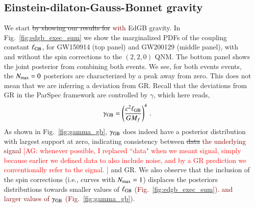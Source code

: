 \documentclass[twocolumn,
               prd,
               aps,
               superscriptaddress,
               tightenlines,
               nofootinbib,
               eqsecnum,
               amsfonts,
               amsmath,
               longbibliography]{revtex4-1}
\newcommand{\agcomm}[1]{{\textcolor{red}{{[AG: #1]}} }}
\newcommand{\ag}[1]{{\textcolor{Maroon}{{#1}} }}
\newcommand{\hs}[1]{{\textcolor{blue}{{[HS: #1]}} }}
\begin{document}



\subsection{Einstein-dilaton-Gauss-Bonnet gravity}
\label{sec:results_edgb}

We start \sout{by showing our results for} \ag{with} EdGB gravity.
%
In Fig.~\ref{fig:edgb_exec_sum} we show the marginalized PDFs of the
coupling constant $\ell_{\rm GB}$, for GW150914 (top panel) and GW200129
(middle panel), with and without the spin corrections to the $(2,2,0)$ QNM.
%
The bottom panel shows the joint posterior from combining both events.
%
We see, for both events events, the $N_{\rm max} = 0$ posteriors are
characterized by a peak away from zero.
%
This does not mean that we are inferring a deviation from GR.
%
Recall that the deviations from GR in the ParSpec framework are controlled
by $\gamma$, which here reads,
%
\begin{equation}
    \gamma_{\rm GB} = \left(\frac{c^2 \ell_{\rm GB}}{ G M_{f}}\right)^4\,.
    \label{eq:def_gamma_gb}
\end{equation}
%
As shown in Fig.~\ref{fig:gamma_gb}, $\gamma_{\rm GB}$ does indeed have a posterior
distribution with largest support at zero, indicating consistency between \sout{data}
\ag{the underlying signal} \agcomm{whenever possible, I replaced ``data" when we
meant signal, simply because earlier we defined data to also include noise, and by a
GR prediction we conventionally refer to the signal. }
and GR.
%
We also observe that the inclusion of the spin corrections (i.e., curves with $N_{\rm max} = 1$)
displaces the posteriors distributions towards smaller values of $\ell_{\rm GB}$ \ag{(Fig.~\ref{fig:edgb_exec_sum}).
and larger values of $\gamma_{\rm GB}$ (Fig.~\ref{fig:gamma_gb}).}
\end{document}
